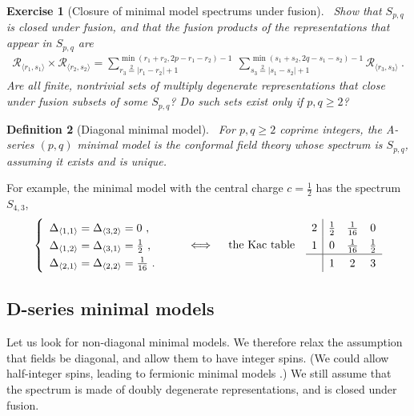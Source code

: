 \documentclass[12pt, a4paper]{article}
\theoremstyle{break}
\newtheorem{exo}{Exercise}[section]
\newtheorem{defn}[exo]{Definition}
\begin{document}
\begin{exo}[Closure of minimal model spectrums under fusion]
 ~\label{exo:cmm}
 Show that $S_{p,q}$ is closed under fusion, and that the fusion products of the representations that appear in $S_{p,q}$ are
 \begin{align}
  \mathcal{R}_{\langle r_1,s_1 \rangle} \times \mathcal{R}_{\langle r_2,s_2 \rangle} = \sum_{r_3\overset{2}{=}|r_1-r_2|+1}^{\min(r_1+r_2,2p-r_1-r_2)-1}\ \sum_{s_3\overset{2}{=}|s_1-s_2|+1}^{\min(s_1+s_2,2q-s_1-s_2)-1} \mathcal{R}_{\langle r_3,s_3 \rangle}\ .
\label{rrmm}
\end{align}
 Are all finite, nontrivial sets of multiply degenerate representations that close under fusion subsets of some $S_{p,q}$? Do such sets exist only if $p,q\geq 2$?
\end{exo}

\begin{defn}[Diagonal minimal model]
 ~\label{def:dmm}
 For $p,q\geq 2$ coprime integers, the A-series $(p,q)$ minimal model is the conformal field theory whose spectrum is $S_{p, q}$, assuming it exists and is unique.
\end{defn}
For example, the minimal model with the central charge $c=\frac12$ has the spectrum $S_{4,3}$, 
\begin{align}
\renewcommand{\arraystretch}{1.3}
 \left\{\begin{array}{l} \Delta_{\langle 1,1\rangle}=\Delta_{\langle 3,2\rangle} = 0 \ , \\ \Delta_{\langle 1,2\rangle} =\Delta_{\langle 3,1\rangle} = \frac12 \ , \\ \Delta_{\langle 2,1\rangle} =\Delta_{\langle 2,2\rangle} = \frac{1}{16} \ .\end{array}\right. 
 \qquad \iff \quad \text{the Kac table} \quad 
 \begin{array}{c|ccc} 2 & \frac{1}{2} & \frac{1}{16} & 0 \\ 1 & 0 & \frac{1}{16} & \frac{1}{2} \\  \hline & 1 & 2 & 3 \end{array} 
\end{align}

\subsection{D-series minimal models}\label{sec:dmm}

Let us look for non-diagonal minimal models. We therefore relax the assumption that fields be diagonal, and allow them to have integer spins. (We could allow half-integer spins, leading to fermionic minimal models \cite{pet88}.) We still assume that the spectrum is made of doubly degenerate representations, and is closed under fusion.
\end{document}
